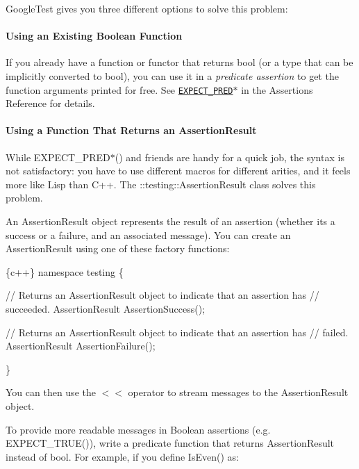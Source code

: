 Google\+Test gives you three different options to solve this problem\+:

\paragraph*{Using an Existing Boolean Function}

If you already have a function or functor that returns {\ttfamily bool} (or a type that can be implicitly converted to {\ttfamily bool}), you can use it in a {\itshape predicate assertion} to get the function arguments printed for free. See \href{reference/assertions.md#EXPECT_PRED}{\tt {\ttfamily E\+X\+P\+E\+C\+T\+\_\+\+P\+R\+E\+D$\ast$}} in the Assertions Reference for details.

\paragraph*{Using a Function That Returns an Assertion\+Result}

While {\ttfamily E\+X\+P\+E\+C\+T\+\_\+\+P\+R\+E\+D$\ast$()} and friends are handy for a quick job, the syntax is not satisfactory\+: you have to use different macros for different arities, and it feels more like Lisp than C++. The {\ttfamily \+::testing\+::\+Assertion\+Result} class solves this problem.

An {\ttfamily Assertion\+Result} object represents the result of an assertion (whether it\textquotesingle{}s a success or a failure, and an associated message). You can create an {\ttfamily Assertion\+Result} using one of these factory functions\+:


\begin{DoxyCode}
\{c++\}
namespace testing \{

// Returns an AssertionResult object to indicate that an assertion has
// succeeded.
AssertionResult AssertionSuccess();

// Returns an AssertionResult object to indicate that an assertion has
// failed.
AssertionResult AssertionFailure();

\}
\end{DoxyCode}


You can then use the {\ttfamily $<$$<$} operator to stream messages to the {\ttfamily Assertion\+Result} object.

To provide more readable messages in Boolean assertions (e.\+g. {\ttfamily E\+X\+P\+E\+C\+T\+\_\+\+T\+R\+U\+E()}), write a predicate function that returns {\ttfamily Assertion\+Result} instead of {\ttfamily bool}. For example, if you define {\ttfamily Is\+Even()} as\+:


